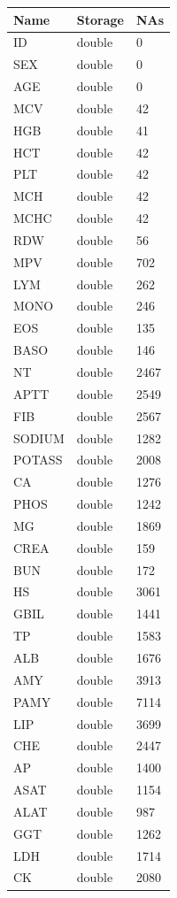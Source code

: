 \documentclass[
  letterpaper,
  DIV=11,
  numbers=noendperiod]{scrreport}
\begin{document}
\begin{longtable}[]{@{}lll@{}}
\toprule()
Name & Storage & NAs \\
\midrule()
\endhead
ID & double & 0 \\
SEX & double & 0 \\
AGE & double & 0 \\
MCV & double & 42 \\
HGB & double & 41 \\
HCT & double & 42 \\
PLT & double & 42 \\
MCH & double & 42 \\
MCHC & double & 42 \\
RDW & double & 56 \\
MPV & double & 702 \\
LYM & double & 262 \\
MONO & double & 246 \\
EOS & double & 135 \\
BASO & double & 146 \\
NT & double & 2467 \\
APTT & double & 2549 \\
FIB & double & 2567 \\
SODIUM & double & 1282 \\
POTASS & double & 2008 \\
CA & double & 1276 \\
PHOS & double & 1242 \\
MG & double & 1869 \\
CREA & double & 159 \\
BUN & double & 172 \\
HS & double & 3061 \\
GBIL & double & 1441 \\
TP & double & 1583 \\
ALB & double & 1676 \\
AMY & double & 3913 \\
PAMY & double & 7114 \\
LIP & double & 3699 \\
CHE & double & 2447 \\
AP & double & 1400 \\
ASAT & double & 1154 \\
ALAT & double & 987 \\
GGT & double & 1262 \\
LDH & double & 1714 \\
CK & double & 2080 \\

\end{longtable}
\end{document}
